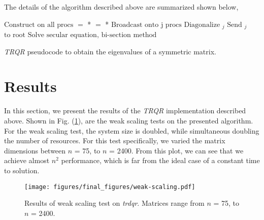 \documentclass[twocolumn]{article}
\begin{document}
%
The details of the algorithm described above are summarized shown below,
\begin{algorithm}[H]
\begin{algorithmic}[1]
\STATE $\text{Construct}$  \bm{$\Omega$} $\text{on all procs}$
\STATE {} $=$ \bm{$\Omega$} * 
\STATE {} $=$  * \bm{$\Omega$}
\ENDFOR
\STATE $\text{Broadcast}$  $\text{onto j procs}$ 
\STATE $\text{Diagonalize}$  $_{j}$
\STATE $\text{Send}$  $_{j}$ $\text{to root}$
\ENDFOR
\STATE $\text{Solve secular equation, bi-section method}$
\end{algorithmic}
\caption{\textit{TRQR} pseudocode to obtain the eigenvalues of a symmetric matrix.}
\label{alg:seq}
\end{algorithm}

\section{Results}
\cfoot{\thepage}
\rfoot{}
\rhead{}
In this section, we present the results of the \textit{TRQR} implementation described above.  Shown in Fig. (\ref{fig:weak}), are the weak scaling tests on the presented algorithm.  For the weak scaling test, the system size is doubled, while simultaneous doubling the number of resources.  For this test specifically, we varied the matrix dimensions between $n$ = 75, to $n$ = 2400.  From this plot, we can see that we achieve almost $n$$^{2}$ performance, which is far from the ideal case of a constant time to solution.  
\begin{figure}[ht]
\texttt{[image: figures/final\_figures/weak-scaling.pdf]}
\caption{Results of weak scaling test on \textit{trdqr}.  Matrices range from $n$ = 75, to $n$ = 2400.}
\label{fig:weak}
\end{figure}
\end{document}
